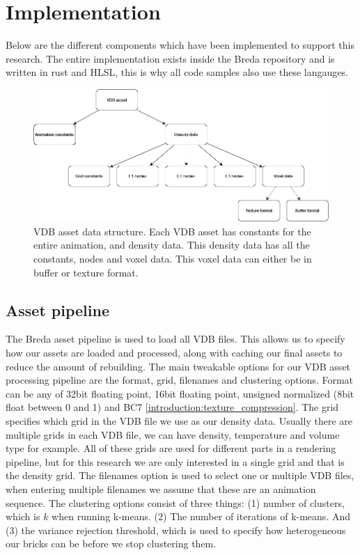 \section{Implementation} \label{implementation}
Below are the different components which have been implemented to support this research. The entire implementation exists inside the Breda repository and is written in rust and HLSL, this is why all code samples also use these langauges.

\begin{figure}
    \centering
    \includegraphics[width=\linewidth]{figures/vdb_asset.png}
    \caption{VDB asset data structure. Each VDB asset has constants for the entire animation, and density data. This density data has all the constants, nodes and voxel data. This voxel data can either be in buffer or texture format. }
    \label{fig:vdb_asset}
\end{figure}

\subsection{Asset pipeline} \label{implementation:asset_pipeline}
The Breda asset pipeline is used to load all VDB files. This allows us to specify how our assets are loaded and processed, along with caching our final assets to reduce the amount of rebuilding. The main tweakable options for our VDB asset processing pipeline are the format, grid, filenames and clustering options. Format can be any of 32bit floating point, 16bit floating point, unsigned normalized (8bit float between 0 and 1) and BC7 \ref{introduction:texture_compression}. The grid specifies which grid in the VDB file we use as our density data. Usually there are multiple grids in each VDB file, we can have density, temperature and volume type for example. All of these grids are used for different parts in a rendering pipeline, but for this research we are only interested in a single grid and that is the density grid. The filenames option is used to select one or multiple VDB files, when entering multiple filenames we assume that these are an animation sequence. The clustering options consist of three things: (1) number of clusters, which is $k$ when running k-means. (2) The number of iterations of k-means. And (3) the variance rejection threshold, which is used to specify how heterogeneous our bricks can be before we stop clustering them.

